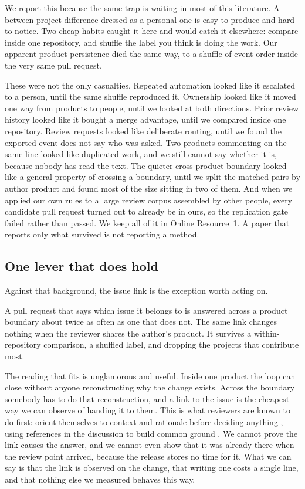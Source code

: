 \documentclass[lineno,pdflatex,sn-basic]{sn-jnl}
\begin{document}
We report this because the same trap is waiting in most of this literature. A
between-project difference dressed as a personal one is easy to produce and hard
to notice. Two cheap habits caught it here and would catch it elsewhere: compare
inside one repository, and shuffle the label you think is doing the work. Our
apparent product persistence died the same way, to a shuffle of event order
inside the very same pull request.

These were not the only casualties. Repeated automation looked like it escalated
to a person, until the same shuffle reproduced it. Ownership looked like it moved one
way from products to people, until we looked at both directions. Prior review
history looked like it bought a merge advantage, until we compared inside one
repository. Review requests looked like deliberate routing, until we found the
exported event does not say who was asked. Two products commenting on the same line looked like duplicated work, and we
still cannot say whether it is, because nobody has read the text. The quieter
cross-product boundary looked like a general property of crossing a boundary,
until we split the matched pairs by author product and found most of the size
sitting in two of them. And when we applied our own rules to a large review
corpus assembled by other people, every candidate pull request turned out to
already be in ours, so the replication gate failed rather than passed. We keep
all of it in Online Resource~1. A paper that reports only what survived is not
reporting a method.

\subsection{One lever that does hold}

Against that background, the issue link is the exception worth acting on.

A pull request that says which issue it belongs to is answered across a product
boundary about twice as often as one that does not. The same link changes
nothing when the reviewer shares the author's product. It survives a
within-repository comparison, a shuffled label, and dropping the projects that
contribute most.

The reading that fits is unglamorous and useful. Inside one product the loop can
close without anyone reconstructing why the change exists. Across the boundary
somebody has to do that reconstruction, and a link to the issue is the cheapest
way we can observe of handing it to them. This is what reviewers are known to do
first: orient themselves to context and rationale before deciding anything
\citep{heander2026decisionmaking}, using references in the discussion to build
common ground \citep{chopra2021referencing}. We cannot prove the link causes the
answer, and we cannot even show that it was already there when the review point
arrived, because the release stores no time for it. What we can say is that the
link is observed on the change, that writing one costs a single line, and that
nothing else we measured behaves this way.
\end{document}
